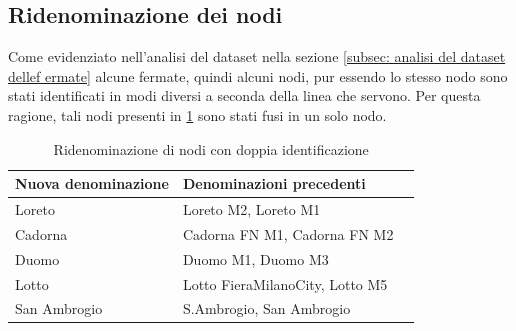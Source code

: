 \subsection{Ridenominazione dei nodi}
Come evidenziato nell'analisi del dataset nella sezione \ref{subsec: analisi del dataset dellef ermate} alcune fermate, quindi alcuni nodi, pur essendo lo stesso nodo sono stati identificati in modi diversi a seconda della linea che servono. Per questa ragione, tali nodi presenti in \ref{tab:Ridenominazione di nodi con doppia identificazione} sono stati fusi in un solo nodo.

\vspace{1em}
\begin{table}[h!]
\centering
\begin{tabular}{lll}
\hline
\textbf{Nuova denominazione} & \textbf{Denominazioni precedenti} \\
\hline
Loreto &  Loreto M2, Loreto M1 \\
Cadorna & Cadorna FN M1, Cadorna FN M2\\
Duomo &  Duomo M1, Duomo M3 \\
Lotto &  Lotto FieraMilanoCity, Lotto M5\\
San Ambrogio &  S.Ambrogio, San Ambrogio \\
\hline
\end{tabular}
\caption{Ridenominazione di nodi con doppia identificazione}
\label{tab:Ridenominazione di nodi con doppia identificazione}
\end{table}
\vspace{1em}